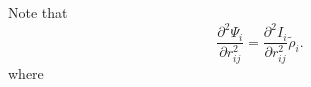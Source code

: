 \documentclass[12pt]{article}
\begin{document}
Note that
\begin{equation}
\frac{\partial^{2}{\Psi}_{i}}{\partial r_{ij}^{2}} = \frac{\partial^{2}I_{i}}{\partial r_{ij}^{2}}{\tilde{\rho}_{i}}.
\end{equation}
where
\end{document}
